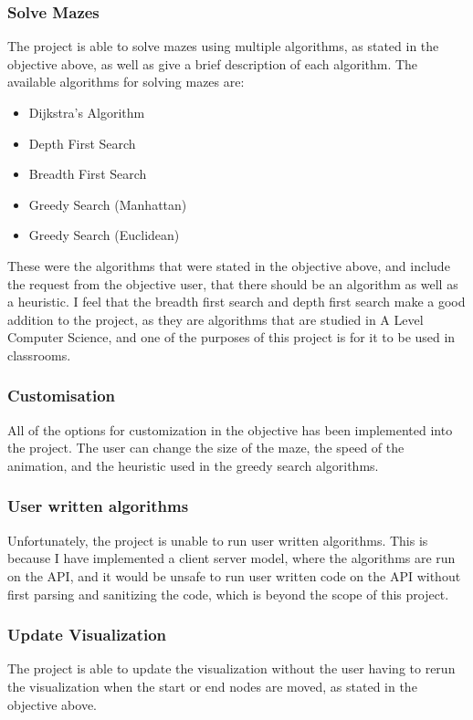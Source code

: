 \documentclass[titlepage]{article}
\begin{document}
\subsubsection{Solve Mazes}
The project is able to solve mazes using multiple algorithms, as stated in the objective above, as well as give a brief description of each algorithm. The available algorithms for solving mazes are:
\begin{itemize}
    \item Dijkstra's Algorithm
    \item Depth First Search
    \item Breadth First Search
    \item Greedy Search (Manhattan)
    \item Greedy Search (Euclidean)
\end{itemize}
These were the algorithms that were stated in the objective above, and include the request from the objective user, that there should be an algorithm as well as a heuristic. I feel that the breadth first search and depth first search make a good addition to the project, as they are algorithms that are studied in A Level Computer Science, and one of the purposes of this project is for it to be used in classrooms.

\subsubsection{Customisation}
All of the options for customization in the objective has been implemented into the project. The user can change the size of the maze, the speed of the animation, and the heuristic used in the greedy search algorithms.

\subsubsection{User written algorithms}
Unfortunately, the project is unable to run user written algorithms. This is because I have implemented a client server model, where the algorithms are run on the API, and it would be unsafe to run user written code on the API without first parsing and sanitizing the code, which is beyond the scope of this project.

\subsubsection{Update Visualization}
The project is able to update the visualization without the user having to rerun the visualization when the start or end nodes are moved, as stated in the objective above.
\end{document}
